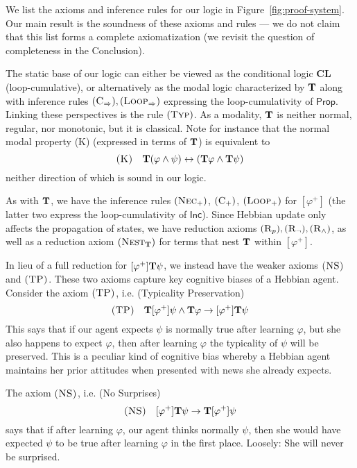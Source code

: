 \documentclass[letterpaper]{article}
\theoremstyle{definition}
\newcommand{\Typ}{\textrm{\textup{\textbf{T}}}}
\newcommand{\Prop}{\textsf{Prop}}
\newcommand{\Inc}{\textsf{Inc}}
\newcommand{\axiom}{\textsc}
\begin{document}
We list the axioms and inference rules for our logic in Figure~\ref{fig:proof-system}.  Our main result is the soundness of these axioms and rules --- we do not claim that this list forms a complete axiomatization (we revisit the question of completeness in the Conclusion).

The static base of our logic can either be viewed as the conditional logic \textbf{CL} (loop-cumulative), or alternatively as the modal logic characterized by $\Typ$ along with inference rules $(\axiom{C}_\Rightarrow), (\axiom{Loop}_\Rightarrow)$ expressing the loop-cumulativity of $\Prop$.  Linking these perspectives is the rule $(\axiom{Typ})$.  As a modality, $\Typ$ is neither normal, regular, nor monotonic, but it is classical.  Note for instance that the normal modal property \axiom{(K)} (expressed in terms of $\Typ$) is equivalent to
\[
\axiom{(K)} \quad \Typ (\varphi \land \psi) \leftrightarrow (\Typ \varphi \land \Typ \psi)
\]
neither direction of which is sound in our logic.

As with $\Typ$, we have the inference rules $(\axiom{Nec}_+)$, $(\axiom{C}_+)$, $(\axiom{Loop}_+)$ for $[\varphi^+]$ (the latter two express the loop-cumulativity of $\Inc$).  Since Hebbian update only affects the propagation of states, we have reduction axioms $(\axiom{R}_p), (\axiom{R}_\neg), (\axiom{R}_\land)$, as well as a reduction axiom $(\axiom{Nest}_\Typ)$ for terms that nest $\Typ$ within $[\varphi^+]$.

In lieu of a full reduction for $[\varphi^+] \Typ \psi$, we instead have the weaker axioms $\axiom{(NS)}$ and $\axiom{(TP)}$.  These two axioms capture key cognitive biases of a Hebbian agent.  Consider the axiom $\axiom{(TP)}$, i.e. (Typicality Preservation)
\[
\axiom{(TP)} \quad \Typ [\varphi^+] \psi \land \Typ \varphi \to [\varphi^+] \Typ \psi
\]
This says that if our agent expects $\psi$ is normally true after learning $\varphi$, but she also happens to expect $\varphi$, then after learning $\varphi$ the typicality of $\psi$ will be preserved.  This is a peculiar kind of cognitive bias whereby a Hebbian agent maintains her prior attitudes when presented with news she already expects.

The axiom $\axiom{(NS)}$, i.e. (No Surprises)
\[
\axiom{(NS)} \quad [\varphi^+] \Typ \psi \to \Typ [\varphi^+] \psi
\]
says that if after learning $\varphi$, our agent thinks normally $\psi$, then she would have expected $\psi$ to be true after learning $\varphi$ in the first place.  Loosely: She will never be surprised.
\end{document}
